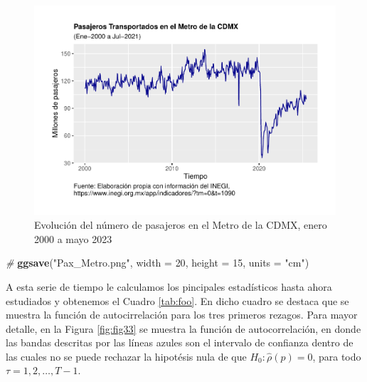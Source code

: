 \documentclass[
]{book}
\newenvironment{Shaded}{\begin{snugshade}}{\end{snugshade}}
\newcommand{\AttributeTok}[1]{\textcolor[rgb]{0.13,0.29,0.53}{#1}}
\newcommand{\CommentTok}[1]{\textcolor[rgb]{0.56,0.35,0.01}{\textit{#1}}}
\newcommand{\DecValTok}[1]{\textcolor[rgb]{0.00,0.00,0.81}{#1}}
\newcommand{\FunctionTok}[1]{\textcolor[rgb]{0.13,0.29,0.53}{\textbf{#1}}}
\newcommand{\NormalTok}[1]{#1}
\newcommand{\StringTok}[1]{\textcolor[rgb]{0.31,0.60,0.02}{#1}}
\begin{document}
\begin{figure}

{\centering \includegraphics{Notas-Series-Tiempo_files/figure-latex/fig32-1} 

}

\caption{Evolución del número de pasajeros en el Metro de la CDMX, enero 2000 a mayo 2023}\label{fig:fig32}
\end{figure}

\begin{Shaded}
\begin{Highlighting}[]
\CommentTok{\#}
\FunctionTok{ggsave}\NormalTok{(}\StringTok{"Pax\_Metro.png"}\NormalTok{, }\AttributeTok{width =} \DecValTok{20}\NormalTok{, }\AttributeTok{height =} \DecValTok{15}\NormalTok{, }\AttributeTok{units =} \StringTok{"cm"}\NormalTok{)}
\end{Highlighting}
\end{Shaded}

A esta serie de tiempo le calculamos los pincipales estadísticos hasta ahora estudiados y obtenemos el Cuadro \ref{tab:foo}. En dicho cuadro se destaca que se muestra la función de autocirrelación para los tres primeros rezagos. Para mayor detalle, en la Figura \ref{fig:fig33} se muestra la función de autocorrelación, en donde las bandas descritas por las líneas azules son el intervalo de confianza dentro de las cuales no se puede rechazar la hipotésis nula de que \(H_0: \hat{\rho}(p) = 0\), para todo \(\tau = 1, 2, \ldots, T-1\).
\end{document}

